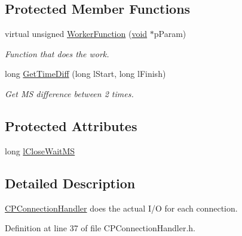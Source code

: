 \subsection*{\-Protected \-Member \-Functions}
\begin{DoxyCompactItemize}
\item 
virtual unsigned \hyperlink{class_c_p_connection_handler_ad7e761b11abc80ceb4573821f38a4244}{\-Worker\-Function} (\hyperlink{_cpclient_8h_a6464f7480a0fd0ee170cba12b2c0497f}{void} $\ast$p\-Param)
\begin{DoxyCompactList}\small\item\em \-Function that does the work. \end{DoxyCompactList}\item 
long \hyperlink{class_c_p_connection_handler_abd4504be00d42202170b8ee762f4f5f3}{\-Get\-Time\-Diff} (long l\-Start, long l\-Finish)
\begin{DoxyCompactList}\small\item\em \-Get \-M\-S difference between 2 times. \end{DoxyCompactList}\end{DoxyCompactItemize}
\subsection*{\-Protected \-Attributes}
\begin{DoxyCompactItemize}
\item 
long \hyperlink{class_c_p_connection_handler_a8d29ca9b1dde7b894038e70a19a9c30f}{l\-Close\-Wait\-M\-S}
\end{DoxyCompactItemize}


\subsection{\-Detailed \-Description}
\hyperlink{class_c_p_connection_handler}{\-C\-P\-Connection\-Handler} does the actual \-I/\-O for each connection. 

\-Definition at line 37 of file \-C\-P\-Connection\-Handler.\-h.



